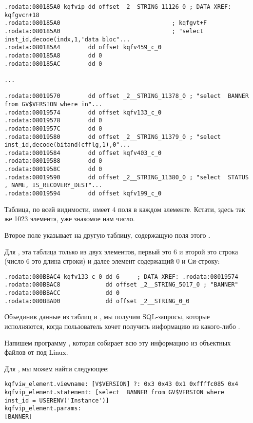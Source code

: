 \begin{lstlisting}[caption=kqf.o]
.rodata:080185A0 kqfvip dd offset _2__STRING_11126_0 ; DATA XREF: kqfgvcn+18
.rodata:080185A0                                ; kqfgvt+F
.rodata:080185A0                                ; "select inst_id,decode(indx,1,'data bloc"...
.rodata:080185A4        dd offset kqfv459_c_0
.rodata:080185A8        dd 0
.rodata:080185AC        dd 0

...

.rodata:08019570        dd offset _2__STRING_11378_0 ; "select  BANNER from GV$VERSION where in"...
.rodata:08019574        dd offset kqfv133_c_0
.rodata:08019578        dd 0
.rodata:0801957C        dd 0
.rodata:08019580        dd offset _2__STRING_11379_0 ; "select inst_id,decode(bitand(cfflg,1),0"...
.rodata:08019584        dd offset kqfv403_c_0
.rodata:08019588        dd 0
.rodata:0801958C        dd 0
.rodata:08019590        dd offset _2__STRING_11380_0 ; "select  STATUS , NAME, IS_RECOVERY_DEST"...
.rodata:08019594        dd offset kqfv199_c_0
\end{lstlisting}

Таблица, по всей видимости, имеет 4 поля в каждом элементе. Кстати, здесь так же 1023 элемента, уже знакомое нам число.

Второе поле указывает на другую таблицу, содержащую поля этого .

Для , эта таблица только из двух элементов, первый это 6 и второй это строка 
 (число 6 это длина строки) и далее  элемент содержащий 0 и  
Си-строку:

\begin{lstlisting}[caption=kqf.o]
.rodata:080BBAC4 kqfv133_c_0 dd 6     ; DATA XREF: .rodata:08019574
.rodata:080BBAC8             dd offset _2__STRING_5017_0 ; "BANNER"
.rodata:080BBACC             dd 0
.rodata:080BBAD0             dd offset _2__STRING_0_0
\end{lstlisting}

Объединив данные из таблиц  и , мы получим SQL-запросы, которые исполняются, когда пользователь хочет получить информацию из какого-либо .

Напишем программу \oracletables, которая собирает всю эту информацию из объектных файлов от \oracle под Linux.

Для , мы можем найти следующее:

\begin{lstlisting}[caption=Результат работы \OracleTablesName]
kqfviw_element.viewname: [V$VERSION] ?: 0x3 0x43 0x1 0xffffc085 0x4
kqfvip_element.statement: [select  BANNER from GV$VERSION where inst_id = USERENV('Instance')]
kqfvip_element.params:
[BANNER] 
\end{lstlisting}

